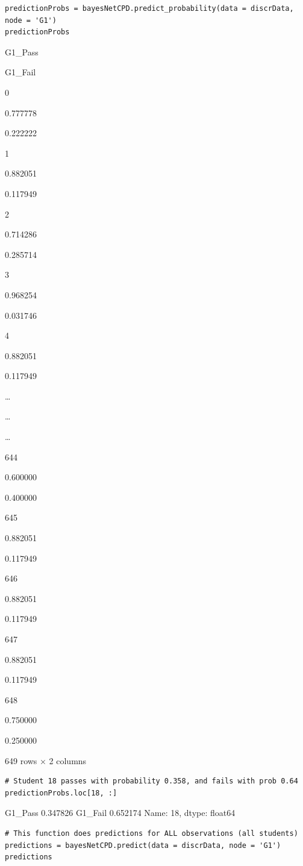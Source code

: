 \documentclass[
]{article}
\begin{document}
\begin{verbatim}
predictionProbs = bayesNetCPD.predict_probability(data = discrData, node = 'G1')
predictionProbs
\end{verbatim}

G1\_Pass

G1\_Fail

0

0.777778

0.222222

1

0.882051

0.117949

2

0.714286

0.285714

3

0.968254

0.031746

4

0.882051

0.117949

\ldots{}

\ldots{}

\ldots{}

644

0.600000

0.400000

645

0.882051

0.117949

646

0.882051

0.117949

647

0.882051

0.117949

648

0.750000

0.250000

649 rows × 2 columns

\begin{verbatim}
# Student 18 passes with probability 0.358, and fails with prob 0.64
predictionProbs.loc[18, :]
\end{verbatim}

G1\_Pass 0.347826 G1\_Fail 0.652174 Name: 18, dtype: float64

\begin{verbatim}
# This function does predictions for ALL observations (all students)
predictions = bayesNetCPD.predict(data = discrData, node = 'G1')
predictions
\end{verbatim}
\end{document}
